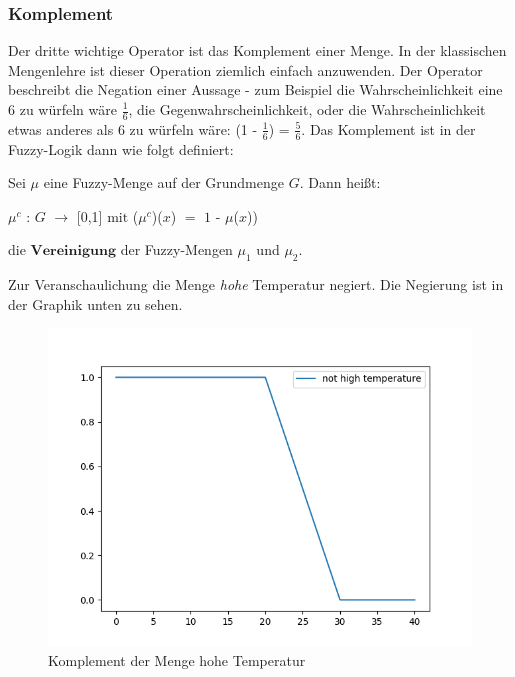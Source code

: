 \subsubsection{Komplement}

Der dritte wichtige Operator ist das Komplement einer Menge. In der klassischen Mengenlehre ist dieser Operation ziemlich einfach anzuwenden. Der Operator beschreibt die Negation einer Aussage - zum Beispiel die Wahrscheinlichkeit eine 6 zu würfeln wäre $\frac{1}{6}$, die Gegenwahrscheinlichkeit, oder die Wahrscheinlichkeit etwas anderes als 6 zu würfeln wäre: (1 - $\frac{1}{6}$) = $\frac{5}{6}$. Das Komplement ist in der Fuzzy-Logik dann wie folgt definiert: 

\begin{definition}
	Sei $\mu$ eine Fuzzy-Menge auf der Grundmenge $G$. Dann heißt:
	\begin{center}
		$\mu^c$  : $G$ $\rightarrow$ [0,1] $\text{mit}$  ($\mu^c$)($x$) $=$ $1$ - $\mu$($x$)) 
	\end{center}
	die $\textbf{Vereinigung}$ der Fuzzy-Mengen $\mu_1$ und $\mu_2$.
\end{definition}

Zur Veranschaulichung die Menge \textit{hohe} Temperatur negiert. Die Negierung ist in der Graphik unten zu sehen.


\begin{figure}[htbp]\label{not_high_temp}
	\centering
	\includegraphics[scale=0.5]{images/not_high_temp.png}
	\caption{Komplement der Menge hohe Temperatur}
\end{figure}

